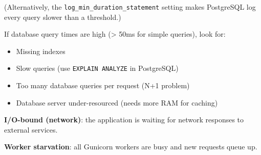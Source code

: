 \begin{codebox}[short]

\begin{Shaded}
\begin{Highlighting}[]
  

 \NormalTok{, }\NormalTok{) }
 
 \NormalTok{;}
\end{Highlighting}
\end{Shaded}

\end{codebox}

\noindent{}(Alternatively, the \texttt{log\_}\allowbreak{}\texttt{min\_}\allowbreak{}\texttt{duration\_}\allowbreak{}\texttt{statement} setting makes PostgreSQL log every query slower than a threshold.)

If database query times are high (\textgreater{} 50ms for simple queries), look for:

\begin{itemize}
\tightlist
\item
  Missing indexes
\item
  Slow queries (use \texttt{EXPLAIN\ ANALYZE} in PostgreSQL)
\item
  Too many database queries per request (N+1 problem)
\item
  Database server under-resourced (needs more RAM for caching)
\end{itemize}

\noindent{}\textbf{I/O-bound (network)}: the application is waiting for network responses to external services.

\textbf{Worker starvation}: all Gunicorn workers are busy and new requests queue up.

